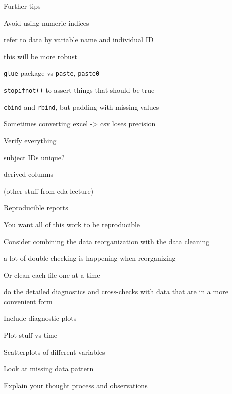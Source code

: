 \documentclass[aspectratio=169,12pt,t]{beamer}
\begin{document}
\begin{frame}{Further tips}

\bbi
\item Avoid using numeric indices
  \bi
\item refer to data by variable name and individual ID
\item this will be more {\hilit robust}
  \ei
\item {\tt glue} package vs {\tt paste}, {\tt paste0}
\item {\tt stopifnot()} to assert things that should be true
\item {\tt cbind} and {\tt rbind}, but padding with missing values
\item Sometimes converting excel -> csv loses precision
  \ei

  \note{
  }
\end{frame}




\begin{frame}{Verify everything}

\bbi
\item subject IDs unique?
\item derived columns
\item (other stuff from eda lecture)
\ei

  \note{
  }
\end{frame}




\begin{frame}{Reproducible reports}

\bbi
\item You want all of this work to be reproducible
\item Consider combining the data reorganization with the data
  cleaning
  \bi
    \item a lot of double-checking is happening when reorganizing
  \ei
\item Or clean each file one at a time
  \bi
    \item do the detailed diagnostics and cross-checks with data that are
      in a more convenient form
  \ei
\item Include diagnostic plots
  \bi
    \item Plot stuff vs time
    \item Scatterplots of different variables
    \item Look at missing data pattern
  \ei
\item Explain your thought process and observations
  \ei

  \note{
  }
\end{frame}
\end{document}
